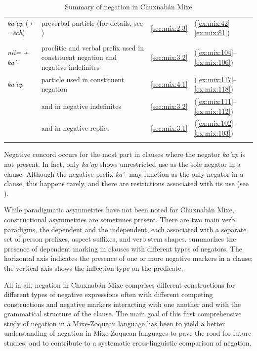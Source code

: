 \documentclass[output=paper,colorlinks,citecolor=brown,draft]{langscibook}
\begin{document}
\begin{table}
\begin{tabularx}{\textwidth}{lQll}
\tablevspace
{}  \\
\midrule
{\textit{ka’ap} (\textit{+ =ëch})} & {preverbal particle (for details, see )} & {\ref{sec:mix:2.3}} & {(\ref{ex:mix:42}--\ref{ex:mix:81})}\\

\tablevspace
{}   \\
\midrule 
{\textit{nii= + ka’-}} & {proclitic and verbal prefix used in constituent negation and negative indefinites} & {\ref{sec:mix:3.2}} & {(\ref{ex:mix:104}--\ref{ex:mix:106})}\\
{\itshape ka’ap} & {particle used in constituent negation} & {\ref{sec:mix:4.1}} & {(\ref{ex:mix:117}--\ref{ex:mix:118})}\\
    & {and in negative indefinites} &{\ref{sec:mix:3.2}}& {(\ref{ex:mix:111}--\ref{ex:mix:112})}\\
    & {and in negative replies} & {\ref{sec:mix:3.1}} & {(\ref{ex:mix:102}--\ref{ex:mix:103})}\\
\lspbottomrule
\end{tabularx}
\caption{Summary of negation in Chuxnabán Mixe}
\label{tab:mix:11new}
\end{table}


Negative concord occurs for the most part in clauses where the negator \textit{ka’ap} is not present. In fact, only \textit{ka’ap} shows unrestricted use as the sole negator in a clause. Although the negative prefix \textit{ka’-} may function as the only negator in a clause, this happens rarely, and there are restrictions associated with its use (see ).

While paradigmatic asymmetries have not been noted for Chuxnabán Mixe, constructional asymmetries are sometimes present. There are two main verb paradigms, the dependent and the independent, each associated with a separate set of person prefixes, aspect suffixes, and verb stem shapes.  summarizes the presence of dependent marking in clauses with different types of negators. The horizontal axis indicates the presence of one or more negative markers in a clause; the vertical axis shows the inflection type on the predicate.


All in all, negation in Chuxnabán Mixe comprises different constructions for different types of negative expressions often with different competing constructions and negative markers interacting with one another and with the grammatical structure of the clause. The main goal of this first comprehensive study of negation in a Mixe-Zoquean language has been to yield a better understanding of negation in Mixe-Zoquean languages to pave the road for future studies, and to contribute to a systematic cross\nobreakdash-linguistic comparison of negation. 
\end{document}
